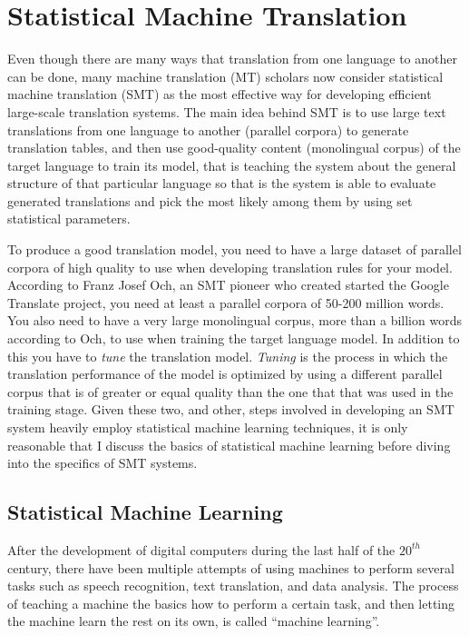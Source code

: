 \chapter{Statistical Machine Translation}
Even though there are many ways that translation from one language to another can be done\cite[p. 5-6]{trujillo2012translation}, many machine translation (MT) scholars now consider statistical machine translation (SMT) as the most effective way for developing efficient large-scale translation systems\cite[p. xi]{koehn2009statistical}. The main idea behind SMT is to use large text translations from one language to another (parallel corpora) to generate translation tables, and then use good-quality content (monolingual corpus) of the target language to train its model, that is teaching the system about the general structure of that particular language so that is the system is able to evaluate generated translations and pick the most likely among them by using set statistical parameters.

To produce a good translation model, you need to have a large dataset of parallel corpora of high quality to use when developing translation rules for your model. According to Franz Josef Och, an SMT pioneer who created started the Google Translate project, you need at least a parallel corpora of 50-200 million words\cite{och2005statistical}.  You also need to have a very large monolingual corpus, more than a billion words according to Och, to use when training the target language model\cite{och2005statistical}. In addition to this you have to \textit{tune} the translation model. \textit{Tuning} is the process in which the translation performance of the model is optimized by using a different parallel corpus that is of greater or equal quality than the one that that was used in the training stage. Given these two, and other, steps involved in developing an SMT system heavily employ statistical machine learning techniques, it is only reasonable that I discuss the basics of statistical machine learning before diving into the specifics of SMT systems. 

\section{Statistical Machine Learning}

After the development of digital computers during the last half of the $20^{th}$ century, there have been multiple attempts of using machines to perform several tasks such as speech recognition, text translation, and data analysis. The process of teaching a machine the basics how to perform a certain task, and then letting the machine learn the rest on its own, is called ``machine learning''\cite{princetonml}.

